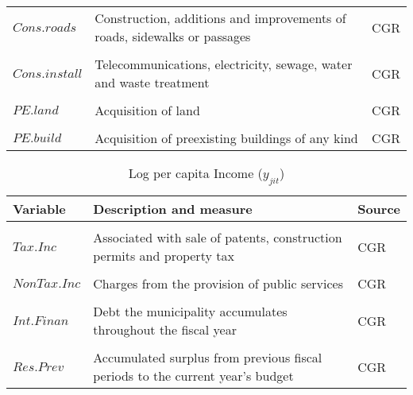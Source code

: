 \begin{table}[ht]
\begin{tabular}{l l l}
\\
$Cons.roads$ & Construction, additions and improvements of roads,
sidewalks or passages & CGR\\
\\
$Cons.install$ & Telecommunications, electricity, sewage, water and waste treatment & CGR\\
\\
$PE.land$ & Acquisition of land & CGR\\
\\
$PE.build$ & Acquisition of preexisting buildings of any kind & CGR \\
[1ex]
\hline
\end{tabular}
\label{table:nonlin}
\end{table}

\begin{table}[ht]
\caption{Log per capita Income ($y_{jit}$)}
\centering
\begin{tabular}{l l l}
\hline\hline
Variable & Description and measure & Source \\ [0.5ex] 
\hline
\\
$Tax.Inc$ & Associated with sale of patents, construction permits and property tax & CGR\\
\\
$NonTax.Inc$ & Charges from the provision of public services & CGR\\
\\
$Int.Finan$ & Debt the municipality accumulates throughout the fiscal year & CGR\\
\\
$Res.Prev$ & Accumulated surplus from previous fiscal periods to the current year's budget & CGR\\
[1ex]
\hline
\end{tabular}
\label{table:nonlin}
\end{table}

